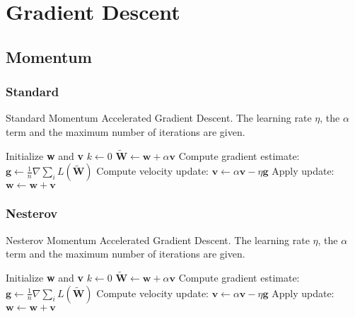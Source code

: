\section{Gradient Descent}



\subsection{Momentum}



\subsubsection{Standard}

\begin{algorithm}[h!]
	\caption{Standard Momentum Accelerated Gradient Descent. The learning rate $\eta$, the $\alpha$ term and the maximum number of iterations are given.}
	\label{alg:sgd}
	\begin{algorithmic}[1]
			\State Initialize \textbf{w} and \textbf{v}
			\State $k \gets 0$
					\State $\tilde{\textbf{W}} \gets \textbf{w} + \alpha \textbf{v}$
				\EndIf
				\State Compute gradient estimate: $\textbf{g} \gets \frac {1}{n} \nabla \sum_i\textit{L}(\tilde{\textbf{W}})$
				\State Compute velocity update: $\textbf{v} \gets \alpha \textbf{v} - \eta \textbf{g}$
				\State Apply update: $\textbf{w} \gets \textbf{w} + \textbf{v}$
			\EndWhile
		\EndProcedure
	\end{algorithmic}
\end{algorithm}

\subsubsection{Nesterov}

\begin{algorithm}[h!]
	\caption{Nesterov Momentum Accelerated Gradient Descent. The learning rate $\eta$, the $\alpha$ term and the maximum number of iterations are given.}
	\label{alg:ngd}
	\begin{algorithmic}[1]
			\State Initialize \textbf{w} and \textbf{v}
			\State $k \gets 0$
					\State $\tilde{\textbf{W}} \gets \textbf{w} + \alpha \textbf{v}$
				\EndIf
				\State Compute gradient estimate: $\textbf{g} \gets \frac {1}{n} \nabla \sum_i\textit{L}(\tilde{\textbf{W}})$
				\State Compute velocity update: $\textbf{v} \gets \alpha \textbf{v} - \eta \textbf{g}$
				\State Apply update: $\textbf{w} \gets \textbf{w} + \textbf{v}$
			\EndWhile
		\EndProcedure
	\end{algorithmic}
\end{algorithm}